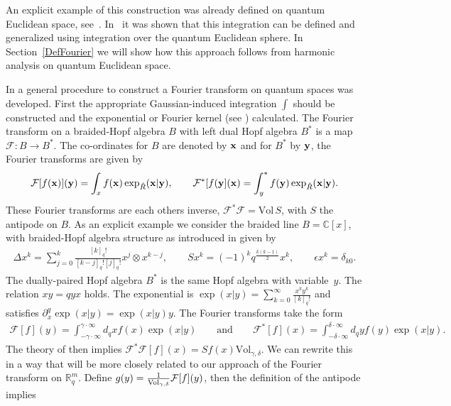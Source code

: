 \documentclass[11pt]{article}
\newcommand{\mR}{\mathbb{R}}
\newcommand{\mC}{\mathbb{C}}
\newcommand{\cF}{\mathcal{F}}
\numberwithin{equation}{section}
\begin{document}
An explicit example of this construction was already def\/ined on quantum Euclidean space, see~\cite{MR1239953}. In~\cite{MR1408120} it was shown that this integration can be def\/ined and generalized using integration over the quantum Euclidean sphere. In Section~\ref{DefFourier} we will show how this approach follows from harmonic analysis on quantum Euclidean space.


In \cite{MR1303081} a general procedure to construct a Fourier transform on quantum spaces was developed. First the appropriate Gaussian-induced integration $\int$ should be constructed and the exponential or Fourier kernel (see \cite{MR1235979, MR2099760}) calculated. The Fourier transform on a braided-Hopf algebra $B$ with left dual Hopf algebra $B^\ast$  is a map $\cF:B\to B^\ast$. The co-ordinates for $B$ are denoted by $\bold{x}$ and for $B^\ast$ by $\bold{y}$, the Fourier transforms are given by
\begin{gather*}
\cF[f(\bold{x})](\bold{y})=\int_x f(\bold{x})\exp_{\hat{R}}(\bold{x}|\bold{y}), \qquad \cF^\ast[f(\bold{y}](\bold{x})=\int^\ast_y f(\bold{y})\exp_{\hat{R}}(\bold{x}|\bold{y}).
\end{gather*}
These Fourier transforms are each others inverse, $\cF^\ast\cF=\mbox{Vol}\, S$, with $S$ the antipode on $B$. As an explicit example we consider the braided line $B=\mC[x]$, with braided-Hopf algebra structure as introduced in \cite{MR1182915} given by
\begin{gather*}
\Delta x^k=\sum_{j=0}^k\frac{[k]_q!}{[k-j]_q![j]_q!}x^j\otimes x^{k-j},\qquad Sx^k=(-1)^kq^{\frac{k(k-1)}{2}}x^k,\qquad\epsilon x^k=\delta_{k0}.
\end{gather*}
The dually-paired Hopf algebra $B^\ast$ is the same Hopf algebra with variable~$y$. The relation $xy=qyx$ holds. The exponential is $\exp(x|y)=\sum\limits_{k=0}^\infty\frac{x^ky^k}{[k]_q!}$ and satisf\/ies $\partial_x^q\exp(x|y)=\exp(x|y)y$. The Fourier transforms take the form
\begin{gather}
\label{Fourline}
\cF[f](y)=\int_{-\gamma\cdot\infty}^{\gamma\cdot\infty}d_qxf(x)\exp(x|y) \qquad \mbox{and}\qquad \cF^\ast[f](x)=\int_{-\delta\cdot\infty}^{\delta\cdot\infty}d_qyf(y)\exp(x|y).
\end{gather}
The theory of \cite{MR1303081} then implies $\cF^\ast\cF[f](x)=Sf(x)\mbox{Vol}_{\gamma,\delta}$. We can rewrite this in a way that will be more closely related to our approach of the Fourier transform on $\mR^m_q$. Def\/ine $g(y)=\frac{1}{{\rm Vol}_{\gamma,\delta}}\cF[f](y)$, then the def\/inition of the antipode implies
\end{document}
